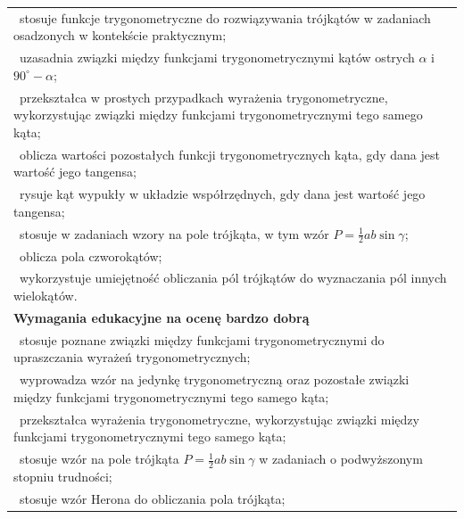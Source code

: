 \documentclass[12pt,a4paper]{article}
\begin{document}
\begin{longtable}{|p{16cm}|}
		\textbullet\ stosuje funkcje trygonometryczne do rozwiązywania trójkątów w zadaniach osadzonych w kontekście praktycznym; \\
		
		\textbullet\ uzasadnia związki między funkcjami trygonometrycznymi kątów ostrych $\alpha$ i $90^\circ-\alpha$; \\
		
		\textbullet\ przekształca w prostych przypadkach wyrażenia trygonometryczne, wykorzystując związki między funkcjami trygonometrycznymi tego samego kąta; \\
		
		\textbullet\ oblicza wartości pozostałych funkcji trygonometrycznych kąta, gdy dana jest wartość jego tangensa; \\
		
		\textbullet\ rysuje kąt wypukły w układzie współrzędnych, gdy dana jest wartość jego tangensa; \\
		
		\textbullet\ stosuje w zadaniach wzory na pole trójkąta, w tym wzór $P=\frac{1}{2}ab\sin\gamma$; \\
		
		\textbullet\ oblicza pola czworokątów; \\
		
		\textbullet\ wykorzystuje umiejętność obliczania pól trójkątów do wyznaczania pól innych wielokątów. \\ \hline
		
		\textbf{Wymagania edukacyjne na ocenę bardzo dobrą} \\ \hline
		
		\textbullet\ stosuje poznane związki między funkcjami trygonometrycznymi do upraszczania wyrażeń trygonometrycznych; \\
		
		\textbullet\ wyprowadza wzór na jedynkę trygonometryczną oraz pozostałe związki między funkcjami trygonometrycznymi tego samego kąta; \\
		
		\textbullet\ przekształca wyrażenia trygonometryczne, wykorzystując związki między funkcjami trygonometrycznymi tego samego kąta; \\
		
		\textbullet\ stosuje wzór na pole trójkąta $P=\frac{1}{2}ab\sin\gamma$ w zadaniach o podwyższonym stopniu trudności; \\
		
		\textbullet\ stosuje wzór Herona do obliczania pola trójkąta; \\
		

\end{longtable}
\end{document}
